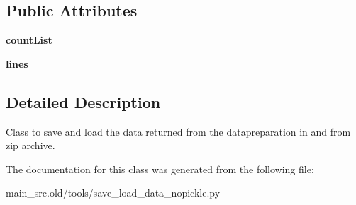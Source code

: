 \subsection*{Public Attributes}
\begin{DoxyCompactItemize}
\item 
\hypertarget{classmain__src_8old_1_1tools_1_1save__load__data__nopickle_1_1SaveLoad_a55a7ab22f3384887b0d8123d7965d21f}{{\bfseries count\-List}}\label{classmain__src_8old_1_1tools_1_1save__load__data__nopickle_1_1SaveLoad_a55a7ab22f3384887b0d8123d7965d21f}

\item 
\hypertarget{classmain__src_8old_1_1tools_1_1save__load__data__nopickle_1_1SaveLoad_aae3d6e1138225777c57001e568811231}{{\bfseries lines}}\label{classmain__src_8old_1_1tools_1_1save__load__data__nopickle_1_1SaveLoad_aae3d6e1138225777c57001e568811231}

\end{DoxyCompactItemize}


\subsection{Detailed Description}
Class to save and load the data returned from the datapreparation in and from zip archive. 

The documentation for this class was generated from the following file\-:\begin{DoxyCompactItemize}
\item 
main\-\_\-src.\-old/tools/save\-\_\-load\-\_\-data\-\_\-nopickle.\-py\end{DoxyCompactItemize}

